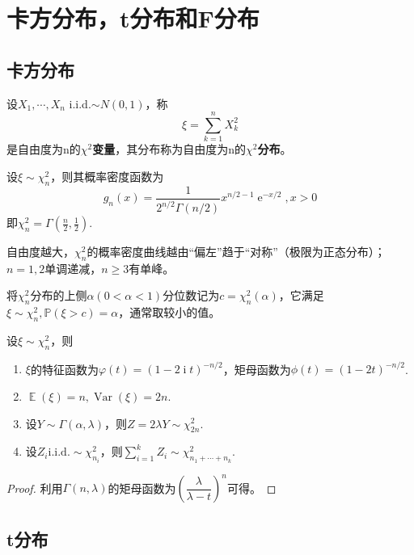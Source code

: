 \documentclass{ctexbook}
\DeclareMathOperator{\e}{e}
\DeclareMathOperator{\im}{i}
\DeclareMathOperator{\Var}{Var}          %
\DeclareMathOperator{\E}{\mathbb{E}}     %
\newcommand{\iid}{\text{i.i.d.}}          %
\newcommand{\rv}{\text{r.v.}}             %
\begin{document}
\section{卡方分布，t分布和F分布}

\subsection{卡方分布}

\begin{definition}
    设$X_1,\cdots,X_n$ i.i.d.$\sim N(0,1)$，称
    $$\xi=\sum_{k=1}^n X_k^2$$
    是自由度为n的\textbf{$\chi^2$变量}，其分布称为自由度为n的\textbf{$\chi^2$分布}。
\end{definition}

\begin{theorem}
    设$\xi\sim \chi_{n}^2$，则其概率密度函数为
    $$g_n(x)=\frac{1}{2^{n/2}\Gamma(n/2)}x^{n/2-1}\e^{-x/2},x>0$$
    即$\chi_{n}^2=\Gamma(\frac{n}{2},\frac{1}{2})$.
\end{theorem}
自由度越大，$\chi_n^2$的概率密度曲线越由“偏左”趋于“对称”（极限为正态分布）；$n=1,2$单调递减，$n\ge 3$有单峰。

将$\chi_n^2$分布的上侧$\alpha(0<\alpha<1)$分位数记为$c=\chi_{n}^2(\alpha)$，它满足$\xi\sim\chi_n^2,\mathbb{P}(\xi>c)=\alpha$，通常取较小的值。

\begin{proposition}
    设\rv $\xi\sim\chi_n^2$，则
    \begin{enumerate}
        \item $\xi$的特征函数为$\varphi(t)=(1-2\im t)^{-n/2}$，矩母函数为$\phi(t)=(1-2t)^{-n/2}$.
        \item $\E(\xi)=n,\Var(\xi)=2n$.
        \item 设$Y\sim\Gamma(\alpha,\lambda)$，则$Z=2\lambda Y\sim\chi_{2n}^2$.
        \item 设$Z_i\iid\sim \chi_{n_i}^2$，则$\sum_{i=1}^k Z_i\sim \chi_{n_1+\cdots+n_k}^2$.
    \end{enumerate}
\end{proposition}
\begin{proof}
    利用$\Gamma(n,\lambda)$的矩母函数为$\left(\dfrac{\lambda}{\lambda-t}\right)^n$可得。
\end{proof}

\subsection{t分布}
\end{document}
